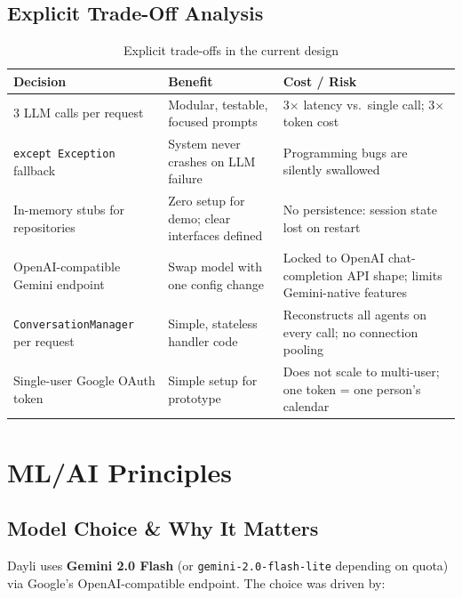 \documentclass[12pt, a4paper]{article}
\begin{document}
\subsection{Explicit Trade-Off Analysis}

\begin{table}[htbp]
\centering
\small
\renewcommand{\arraystretch}{1.4}
\begin{tabularx}{\textwidth}{L{3.5cm} L{4.0cm} X}
\toprule
\textbf{Decision} & \textbf{Benefit} & \textbf{Cost / Risk} \\
 LLM calls per request
  & Modular, testable, focused prompts
  & 3$\times$ latency vs.\ single call; 3$\times$ token cost \\
\texttt{except Exception} fallback
  & System never crashes on LLM failure
  & Programming bugs are silently swallowed \\
In-memory stubs for repositories
  & Zero setup for demo; clear interfaces defined
  & No persistence: session state lost on restart \\
OpenAI-compatible Gemini endpoint
  & Swap model with one config change
  & Locked to OpenAI chat-completion API shape; limits Gemini-native features \\
\texttt{Conversation\-Manager} per request
  & Simple, stateless handler code
  & Reconstructs all agents on every call; no connection pooling \\
Single-user Google OAuth token
  & Simple setup for prototype
  & Does not scale to multi-user; one token = one person's calendar \\
\bottomrule
\end{tabularx}
\caption{Explicit trade-offs in the current design}
\end{table}


\section{ML/AI Principles}

\subsection{Model Choice \& Why It Matters}

Dayli uses \textbf{Gemini 2.0 Flash} (or \texttt{gemini-2.0-flash-lite} depending on quota) via Google's OpenAI-compatible endpoint. The choice was driven by:
\end{document}
